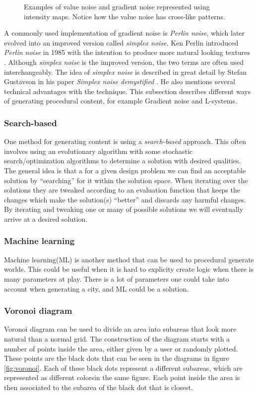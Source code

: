 \begin{figure}[h!]
  \caption{Examples of value noise and gradient noise represented using intensity maps. Notice how the value noise has cross-like patterns.}
  \label{fig:noisetypes}
\end{figure}

A commonly used implementation of gradient noise is \textit{Perlin noise}, which later evolved into an improved version called \textit{simplex noise}.
Ken Perlin introduced \textit{Perlin noise} in 1985 with the intention to produce more natural looking textures \cite{perlin_noise}.
Although \textit{simplex noise} is the improved version, the two terms are often used interchangeably. The idea of \textit{simplex noise} is described in great detail by Stefan Gustavson in his paper \textit{Simplex noise demystified} \cite{simplex_noise}.
He also mentions several technical advantages with the technique.
This subsection describes different ways of generating procedural content, for example Gradient noise and L-systems.

\subsubsection{Search-based}
One method for generating content is using a \textit{search-based} approach.
This often involves using an evolutionary algorithm with some stochastic search/optimization algorithms to determine a solution with desired qualities.
The general idea is that a for a given design problem we can find an acceptable solution by ``searching'' for it within the solution space.
When iterating over the solutions they are tweaked according to an evaluation function that keeps the changes which make the solution(s) ``better'' and discards any harmful changes.
By iterating and tweaking one or many of possible solutions we will eventually arrive at a desired solution.

\subsubsection{Machine learning}
Machine learning(ML) is another method that can be used to procedural generate worlds. 
This could be useful when it is hard to explicity create logic when there is many parameters at play.
There is a lot of parameters one could take into account when generating a city, and ML could be a solution.

\subsubsection{Voronoi diagram}
Voronoi diagram can be used to divide an area into subareas that look more natural than a normal grid. 
The construction of the diagram starts with a number of points inside the area, either given by a user or randomly plotted. 
These points are the black dots that can be seen in the diagrams in figure \ref{fig:voronoi}.
Each of these black dots represent a different subareas, which are represented as different colorsin the same figure.
Each point inside the area is then associated to the subarea of the black dot that is closest.

